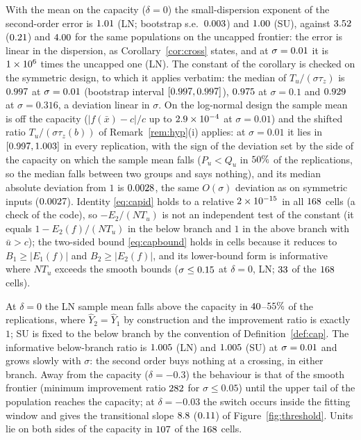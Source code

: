 \documentclass[10pt,a4paper]{article}
\theoremstyle{plain}
\theoremstyle{definition}
\theoremstyle{remark}
\newcommand{\Yh}{\widehat{Y}}
\newcommand{\Tu}{T_u}
\begin{document}
With the mean on the capacity ($\delta=0$) the small-dispersion exponent of the second-order error is $1.01$ (LN; bootstrap s.e.\ $0.003$) and $1.00$ (SU), against $3.52$ ($0.21$) and $4.00$ for the same populations on the uncapped frontier: the error is linear in the dispersion, as Corollary~\ref{cor:cross} states, and at $\sigma=0.01$ it is $1\times 10^{6}$ times the uncapped one (LN). The constant of the corollary is checked on the symmetric design, to which it applies verbatim: the median of $\Tu/(\sigma\tau_z)$ is $0.997$ at $\sigma=0.01$ (bootstrap interval $[0.997, 0.997]$), $0.975$ at $\sigma=0.1$ and $0.929$ at $\sigma=0.316$, a deviation linear in $\sigma$. On the log-normal design the sample mean is off the capacity ($|f(\bar x)-c|/c$ up to $2.9\times 10^{-4}$ at $\sigma=0.01$) and the shifted ratio $\Tu/(\sigma\tau_z(b))$ of Remark~\ref{rem:hyp}(i) applies: at $\sigma=0.01$ it lies in $[0.997,1.003]$ in every replication, with the sign of the deviation set by the side of the capacity on which the sample mean falls ($P_u<Q_u$ in $50\%$ of the replications, so the median falls between two groups and says nothing), and its median absolute deviation from $1$ is $0.0028$, the same $O(\sigma)$ deviation as on symmetric inputs ($0.0027$). Identity \eqref{eq:capid} holds to a relative $2\times 10^{-15}$ in all $168$ cells (a check of the code), so $-E_2/(N\Tu)$ is not an independent test of the constant (it equals $1-E_2(f)/(N\Tu)$ in the below branch and $1$ in the above branch with $\bar u>c$); the two-sided bound \eqref{eq:capbound} holds in \EtwoTwoSided{} cells because it reduces to $B_1\ge|E_1(f)|$ and $B_2\ge|E_2(f)|$, and its lower-bound form is informative where $N\Tu$ exceeds the smooth bounds ($\sigma\le0.15$ at $\delta=0$, LN; $33$ of the $168$ cells).

At $\delta=0$ the LN sample mean falls above the capacity in $40$--$55\%$ of the replications, where $\Yh_2=\Yh_1$ by construction and the improvement ratio is exactly $1$; SU is fixed to the below branch by the convention of Definition~\ref{def:cap}. The informative below-branch ratio is $1.005$ (LN) and $1.005$ (SU) at $\sigma=0.01$ and grows slowly with $\sigma$: the second order buys nothing at a crossing, in either branch. Away from the capacity ($\delta=-0.3$) the behaviour is that of the smooth frontier (minimum improvement ratio $282$ for $\sigma\le0.05$) until the upper tail of the population reaches the capacity; at $\delta=-0.03$ the switch occurs inside the fitting window and gives the transitional slope $8.8$ ($0.11$) of Figure~\ref{fig:threshold}. Units lie on both sides of the capacity in $107$ of the $168$ cells.
\end{document}
